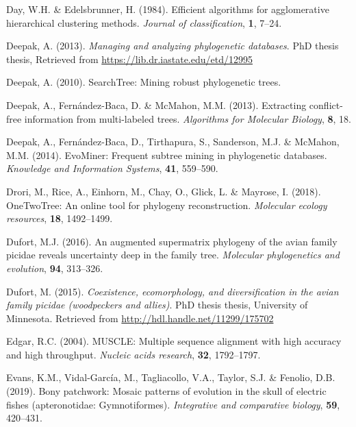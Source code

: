 \documentclass[]{article}
\begin{document}
\leavevmode\hypertarget{ref-day1984efficient}{}%
Day, W.H. \& Edelsbrunner, H. (1984). Efficient algorithms for agglomerative hierarchical clustering methods. \emph{Journal of classification}, \textbf{1}, 7--24.

\leavevmode\hypertarget{ref-deepak2013managing}{}%
Deepak, A. (2013). \emph{Managing and analyzing phylogenetic databases}. PhD thesis thesis, Retrieved from \url{https://lib.dr.iastate.edu/etd/12995}

\leavevmode\hypertarget{ref-deepak2010searchtree}{}%
Deepak, A. (2010). SearchTree: Mining robust phylogenetic trees.

\leavevmode\hypertarget{ref-deepak2013extracting}{}%
Deepak, A., Fernández-Baca, D. \& McMahon, M.M. (2013). Extracting conflict-free information from multi-labeled trees. \emph{Algorithms for Molecular Biology}, \textbf{8}, 18.

\leavevmode\hypertarget{ref-deepak2014evominer}{}%
Deepak, A., Fernández-Baca, D., Tirthapura, S., Sanderson, M.J. \& McMahon, M.M. (2014). EvoMiner: Frequent subtree mining in phylogenetic databases. \emph{Knowledge and Information Systems}, \textbf{41}, 559--590.

\leavevmode\hypertarget{ref-drori2018onetwotree}{}%
Drori, M., Rice, A., Einhorn, M., Chay, O., Glick, L. \& Mayrose, I. (2018). OneTwoTree: An online tool for phylogeny reconstruction. \emph{Molecular ecology resources}, \textbf{18}, 1492--1499.

\leavevmode\hypertarget{ref-dufort2016augmented}{}%
Dufort, M.J. (2016). An augmented supermatrix phylogeny of the avian family picidae reveals uncertainty deep in the family tree. \emph{Molecular phylogenetics and evolution}, \textbf{94}, 313--326.

\leavevmode\hypertarget{ref-dufort2015coexistence}{}%
Dufort, M. (2015). \emph{Coexistence, ecomorphology, and diversification in the avian family picidae (woodpeckers and allies)}. PhD thesis thesis, University of Minnesota. Retrieved from \url{http://hdl.handle.net/11299/175702}

\leavevmode\hypertarget{ref-edgar2004muscle}{}%
Edgar, R.C. (2004). MUSCLE: Multiple sequence alignment with high accuracy and high throughput. \emph{Nucleic acids research}, \textbf{32}, 1792--1797.

\leavevmode\hypertarget{ref-evans2019bony}{}%
Evans, K.M., Vidal-García, M., Tagliacollo, V.A., Taylor, S.J. \& Fenolio, D.B. (2019). Bony patchwork: Mosaic patterns of evolution in the skull of electric fishes (apteronotidae: Gymnotiformes). \emph{Integrative and comparative biology}, \textbf{59}, 420--431.
\end{document}

